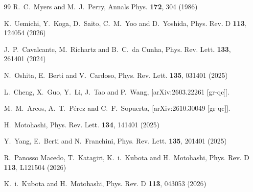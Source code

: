 \documentclass[aps,prl,reprint,superscriptaddress,nofootinbib,floatfix]{revtex4-2}
\begin{document}
\begin{thebibliography}{99}
R.~C.~Myers and M.~J.~Perry,
Annals Phys. \textbf{172}, 304 (1986)

K.~Uemichi, Y.~Koga, D.~Saito, C.~M.~Yoo and D.~Yoshida,
Phys. Rev. D \textbf{113}, 124054 (2026)

J.~P.~Cavalcante, M.~Richartz and B.~C.~da Cunha,
Phys. Rev. Lett. \textbf{133}, 261401 (2024)

N.~Oshita, E.~Berti and V.~Cardoso,
Phys. Rev. Lett. \textbf{135}, 031401 (2025)

L.~Cheng, X.~Guo, Y.~Li, J.~Tao and P.~Wang,
[arXiv:2603.22261 [gr-qc]].

M.~M.~Arcos, A.~T.~P{\'e}rez and C.~F.~Sopuerta,
[arXiv:2610.30049 [gr-qc]].

H.~Motohashi,
Phys. Rev. Lett. \textbf{134}, 141401 (2025)

Y.~Yang, E.~Berti and N.~Franchini,
Phys. Rev. Lett. \textbf{135}, 201401 (2025)

R.~Panosso Macedo, T.~Katagiri, K.~i.~Kubota and H.~Motohashi,
Phys. Rev. D \textbf{113}, L121504 (2026)

K.~i.~Kubota and H.~Motohashi,
Phys. Rev. D \textbf{113}, 043053 (2026)


\end{thebibliography}
\end{document}

